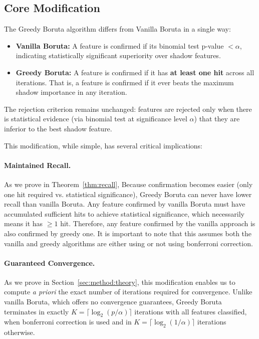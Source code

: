 \documentclass[runningheads]{llncs}
\begin{document}
\subsection{Core Modification}
\label{sec:method:modification}

The Greedy Boruta algorithm differs from Vanilla Boruta in a single way:

\begin{itemize}
    \item \textbf{Vanilla Boruta:} A feature is confirmed if its binomial test p-value $< \alpha$, indicating statistically significant superiority over shadow features.
    \item \textbf{Greedy Boruta:} A feature is confirmed if it has \textbf{at least one hit} across all iterations. That is, a feature is confirmed if it ever beats the maximum shadow importance in any iteration.
\end{itemize}

The rejection criterion remains unchanged: features are rejected only when there is statistical evidence (via binomial test at significance level $\alpha$) that they are inferior to the best shadow feature.

This modification, while simple, has several critical implications:

\paragraph{Maintained Recall.}
As we prove in Theorem~\ref{thm:recall}, Because confirmation becomes easier (only one hit required vs. statistical significance), Greedy Boruta can never have lower recall than vanilla Boruta. Any feature confirmed by vanilla Boruta must have accumulated sufficient hits to achieve statistical significance, which necessarily means it has $\geq 1$ hit. Therefore, any feature confirmed by the vanilla approach is also confirmed by greedy one. It is important to note that this assumes both the vanilla and greedy algorithms are either using or not using bonferroni correction.

\paragraph{Guaranteed Convergence.}
As we prove in Section~\ref{sec:method:theory}, this modification enables us to compute \emph{a priori} the exact number of iterations required for convergence. Unlike vanilla Boruta, which offers no convergence guarantees, Greedy Boruta terminates in exactly $K = \lceil \log_2(p/\alpha) \rceil$ iterations with all features classified, when bonferroni correction is used and in $K = \lceil \log_2(1/\alpha) \rceil$ iterations otherwise.
\end{document}
